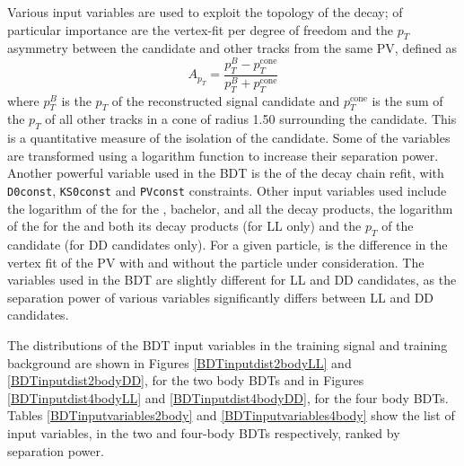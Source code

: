 Various input variables are used to exploit the topology of the decay; of particular importance are the \Bm vertex-fit \chisq per degree of freedom and the $p_T$ asymmetry between the \Bm candidate and other tracks from the same PV, defined as
\begin{equation}
A_{p_T} = \frac{p_T^B - p_T^{\text{cone}}}{p_T^B + p_T^{\text{cone}}}
\end{equation}
where $p_T^B$ is the $p_T$ of the reconstructed \Bm signal candidate and $p_T^{\text{cone}}$ is the sum of the $p_T$ of all other tracks in a cone of radius 1.50 surrounding the \Bm candidate. This is a quantitative measure of the isolation of the \Bm candidate. Some of the variables are transformed using a logarithm function to increase their separation power. Another powerful variable used in the BDT is the \chisq of the decay chain refit, with {\tt D0const}, {\tt KS0const} and {\tt PVconst} constraints. Other input variables used include the logarithm of the \chisqip for the \B, bachelor, \D and all the \D decay products, the logarithm of the \chisqip for the \KS and both its decay products (for LL only) and the $p_T$ of the \KS candidate (for DD candidates only). For a given particle, \chisqip is the difference in the vertex fit \chisq of the PV with and without the particle under consideration. The variables used in the BDT are slightly different for LL and DD candidates, as the separation power of various \KS variables significantly differs between LL and DD candidates. 

The distributions of the BDT input variables in the training signal and training background are shown in Figures \ref{BDTinputdist2bodyLL} and \ref{BDTinputdist2bodyDD}, for the two body BDTs and in Figures \ref{BDTinputdist4bodyLL} and \ref{BDTinputdist4bodyDD}, for the four body BDTs. Tables \ref{BDTinputvariables2body} and \ref{BDTinputvariables4body} show the list of input variables, in the two and four-body BDTs respectively, ranked by separation power.


